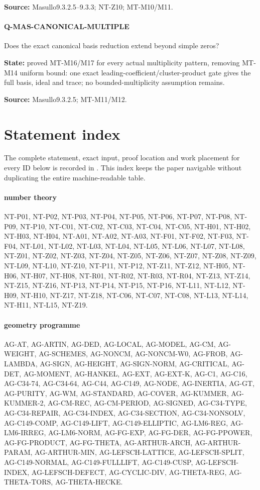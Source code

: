 \documentclass[11pt,a4paper]{article}
\begin{document}
\textbf{Source:} Masullo9.\allowbreak{}3.\allowbreak{}2.\allowbreak{}5–\allowbreak{}9.\allowbreak{}3.\allowbreak{}3; NT-Z10; MT-M10/\allowbreak{}M11.

\paragraph{Q-MAS-CANONICAL-MULTIPLE} Does the exact canonical basis reduction extend beyond simple zeros?

\textbf{State:} proved MT-M16/\allowbreak{}M17 for every actual multiplicity pattern, removing MT-M14 uniform bound:\allowbreak{} one exact leading-coefficient/\allowbreak{}cluster-product gate gives the full basis, ideal and trace; no bounded-multiplicity assumption remains.\allowbreak{}

\textbf{Source:} Masullo9.\allowbreak{}3.\allowbreak{}2.\allowbreak{}5; MT-M11/\allowbreak{}M12.
\section*{Statement index}
The complete statement, exact input, proof location and work placement for
every ID below is recorded in . This index keeps
the paper navigable without duplicating the entire machine-readable table.
\paragraph{number theory} NT-P01, NT-P02, NT-P03, NT-P04, NT-P05, NT-P06, NT-P07, NT-P08, NT-P09, NT-P10, NT-C01, NT-C02, NT-C03, NT-C04, NT-C05, NT-H01, NT-H02, NT-H03, NT-H04, NT-A01, NT-A02, NT-A03, NT-F01, NT-F02, NT-F03, NT-F04, NT-L01, NT-L02, NT-L03, NT-L04, NT-L05, NT-L06, NT-L07, NT-L08, NT-Z01, NT-Z02, NT-Z03, NT-Z04, NT-Z05, NT-Z06, NT-Z07, NT-Z08, NT-Z09, NT-L09, NT-L10, NT-Z10, NT-P11, NT-P12, NT-Z11, NT-Z12, NT-H05, NT-H06, NT-H07, NT-H08, NT-R01, NT-R02, NT-R03, NT-R04, NT-Z13, NT-Z14, NT-Z15, NT-Z16, NT-P13, NT-P14, NT-P15, NT-P16, NT-L11, NT-L12, NT-H09, NT-H10, NT-Z17, NT-Z18, NT-C06, NT-C07, NT-C08, NT-L13, NT-L14, NT-H11, NT-L15, NT-Z19.
\paragraph{geometry programme} AG-AT, AG-ARTIN, AG-DED, AG-LOCAL, AG-MODEL, AG-CM, AG-WEIGHT, AG-SCHEMES, AG-NONCM, AG-NONCM-W0, AG-FROB, AG-LAMBDA, AG-SIGN, AG-HEIGHT, AG-SIGN-NORM, AG-CRITICAL, AG-DET, AG-MOMENT, AG-HANKEL, AG-EXT, AG-EXT-K, AG-C1, AG-C16, AG-C34-74, AG-C34-64, AG-C44, AG-C149, AG-NODE, AG-INERTIA, AG-GT, AG-PURITY, AG-WM, AG-STANDARD, AG-COVER, AG-KUMMER, AG-KUMMER-2, AG-CM-REC, AG-CM-PERIOD, AG-SIGNED, AG-C34-TYPE, AG-C34-REPAIR, AG-C34-INDEX, AG-C34-SECTION, AG-C34-NONSOLV, AG-C149-COMP, AG-C149-LIFT, AG-C149-ELLIPTIC, AG-LM6-REG, AG-LM6-IRREG, AG-LM6-NORM, AG-FG-EXP, AG-FG-DER, AG-FG-PPOWER, AG-FG-PRODUCT, AG-FG-THETA, AG-ARTHUR-ARCH, AG-ARTHUR-PARAM, AG-ARTHUR-MIN, AG-LEFSCH-LATTICE, AG-LEFSCH-SPLIT, AG-C149-NORMAL, AG-C149-FULLLIFT, AG-C149-CUSP, AG-LEFSCH-INDEX, AG-LEFSCH-DEFECT, AG-CYCLIC-DIV, AG-THETA-REG, AG-THETA-TORS, AG-THETA-HECKE.
\end{document}
